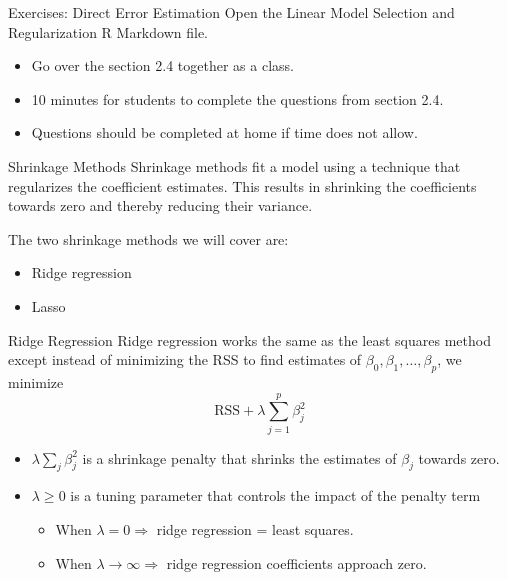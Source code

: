 \documentclass[
  ignorenonframetext,
  aspectratio=169,
]{beamer}
\begin{document}
\begin{frame}{Exercises: Direct Error Estimation}
\protect\hypertarget{exercises-direct-error-estimation}{}
Open the Linear Model Selection and Regularization R Markdown file.

\begin{itemize}
\item
  Go over the section 2.4 together as a class.
\item
  10 minutes for students to complete the questions from section 2.4.
\item
  Questions should be completed at home if time does not allow.
\end{itemize}
\end{frame}

\begin{frame}{Shrinkage Methods}
\protect\hypertarget{shrinkage-methods}{}
Shrinkage methods fit a model using a technique that regularizes the
coefficient estimates. This results in shrinking the coefficients
towards zero and thereby reducing their variance.

The two shrinkage methods we will cover are:

\begin{itemize}
\item
  Ridge regression
\item
  Lasso
\end{itemize}
\end{frame}

\begin{frame}{Ridge Regression}
\protect\hypertarget{ridge-regression}{}
Ridge regression works the same as the least squares method except
instead of minimizing the RSS to find estimates of
\(\beta_{0}, \beta_{1}, \ldots, \beta_{p}\), we minimize \[
\mathrm{RSS}+\lambda \sum_{j=1}^{p} \beta_{j}^{2}
\]

\begin{itemize}
\item
  \(\lambda \sum_{j} \beta_{j}^{2}\) is a shrinkage penalty that shrinks
  the estimates of \(\beta_j\) towards zero.
\item
  \(\lambda \geq 0\) is a tuning parameter that controls the impact of
  the penalty term

  \begin{itemize}
  \item
    When \(\lambda = 0 \Rightarrow\) ridge regression = least squares.
  \item
    When \(\lambda \rightarrow \infty \Rightarrow\) ridge regression
    coefficients approach zero.
  \end{itemize}
\end{itemize}
\end{frame}
\end{document}
